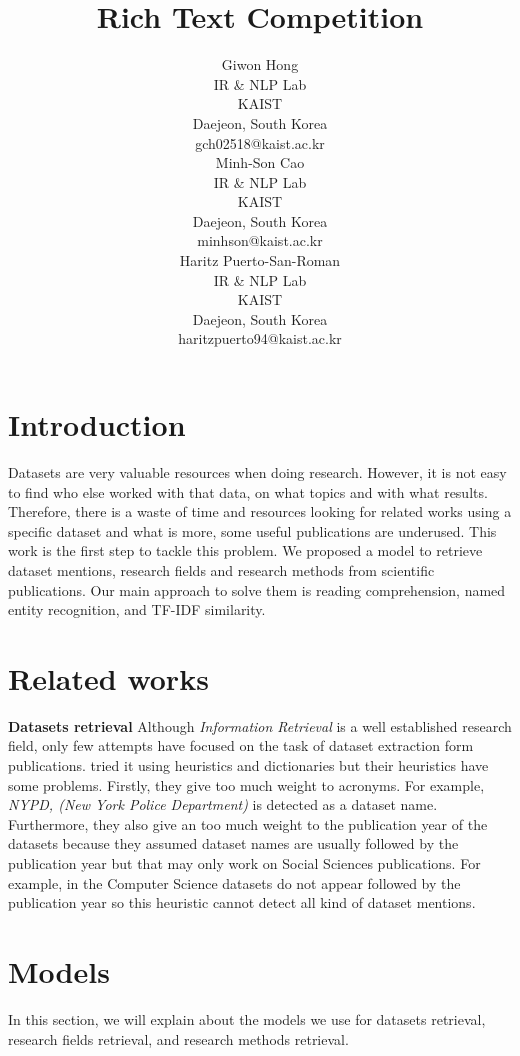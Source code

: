 \documentclass[11pt]{article}
\title{Rich Text Competition}
\author{Giwon Hong \\
  IR \& NLP Lab \\
  KAIST \\
  Daejeon, South Korea \\
  { gch02518@kaist.ac.kr} \\\And
  Minh-Son Cao \\
  IR \& NLP Lab \\
  KAIST \\
  Daejeon, South Korea \\
  { minhson@kaist.ac.kr} \\\And
  Haritz Puerto-San-Roman \\
  IR \& NLP Lab \\
  KAIST \\
  Daejeon, South Korea \\
  { haritzpuerto94@kaist.ac.kr} \\}
\date{}
\begin{document}
\maketitle

\section{Introduction}
Datasets are very valuable resources when doing research. However, it is not easy to find who else worked with that data, on what topics and with what results. Therefore, there is a waste of time and resources looking for related works using a specific dataset and what is more, some useful publications are underused. This work is the first step to tackle this problem. We proposed a model to retrieve dataset mentions, research fields and research methods from scientific publications. Our main approach to solve them is reading comprehension, named entity recognition, and TF-IDF similarity.

\section{Related works}

\textbf{Datasets retrieval} Although \textit{Information Retrieval} is a well established research field, only few attempts have focused on the task of dataset extraction form publications.  \cite{ghavimi2016identifying} tried it using heuristics and dictionaries but their heuristics have some problems. Firstly, they give too much weight to acronyms. For example, \textit{NYPD, (New York Police Department)} is detected as a dataset name. Furthermore, they also give an too much weight to the publication year of the datasets because they assumed dataset names are usually followed by the publication year but that may only work on Social Sciences publications. For example, in the Computer Science datasets do not appear followed by the publication year so this heuristic cannot detect all kind of dataset mentions.

\section{Models}
In this section, we will explain about the models we use for datasets retrieval, research fields retrieval, and research methods retrieval.
\end{document}

